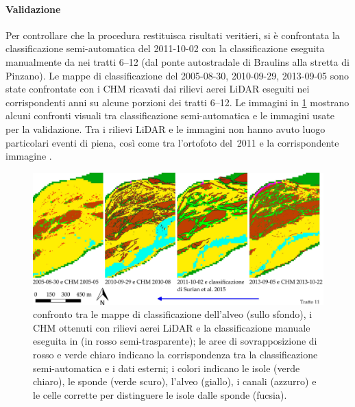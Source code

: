 \paragraph{Validazione}
Per controllare che la procedura restituisca risultati veritieri, si è confrontata la classificazione semi-automatica del 2011-10-02 con la classificazione eseguita manualmente da  nei tratti \numrange[range-phrase={$\div$}]{6}{12} (dal ponte autostradale di Braulins alla stretta di Pinzano).
Le mappe di classificazione del 2005-08-30, 2010-09-29, 2013-09-05 sono state confrontate con i CHM ricavati dai rilievi aerei LiDAR eseguiti nei corrispondenti anni su alcune porzioni dei tratti \numrange[range-phrase={$\div$}]{6}{12}.
Le immagini in \cref{fig:validazione-class-is-fl} mostrano alcuni confronti visuali tra classificazione semi-automatica e le immagini usate per la validazione.
Tra i rilievi LiDAR e le immagini \AST{} non hanno avuto luogo particolari eventi di piena, così come tra l'ortofoto del~2011 e la corrispondente immagine \AST{}.
%	
\begin{figure}
	\centering
	\includegraphics[width=\textwidth]{files/class_mia_vs_surian_chm.jpeg}
	\caption[validazione visuale della classificazione dell'alveo]{confronto tra le mappe di classificazione dell'alveo (sullo sfondo), i CHM ottenuti con rilievi aerei LiDAR e la classificazione manuale eseguita in  (in rosso semi-trasparente); le aree di sovrapposizione di rosso e verde chiaro indicano la corrispondenza tra la classificazione semi-automatica e i dati esterni; i colori indicano le isole (verde chiaro), le sponde (verde scuro), l'alveo (giallo), i canali (azzurro) e le celle corrette per distinguere le isole dalle sponde (fucsia).}
	\label{fig:validazione-class-is-fl}
\end{figure}
%
